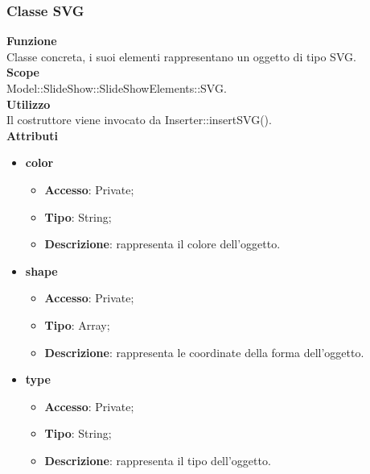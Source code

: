 {	\subsubsection{Classe SVG}{
		\label{SVG}
		\textbf{Funzione}\\
			\indent Classe concreta, i suoi elementi rappresentano un oggetto di tipo SVG.\\
	   	\textbf{Scope}\\
			\indent Model::SlideShow::SlideShowElements::SVG.\\
		\textbf{Utilizzo}\\
			\indent Il costruttore viene invocato da Inserter::insertSVG().\\
		\textbf{Attributi}
		\begin{itemize}
			\item \textbf{color}
			\begin{itemize}
				\item \textbf{Accesso}: Private;
				\item \textbf{Tipo}: String;
				\item \textbf{Descrizione}: rappresenta il colore dell’oggetto.
			\end{itemize}
			\item \textbf{shape}
			\begin{itemize}
				\item \textbf{Accesso}: Private;
				\item \textbf{Tipo}: Array;
				\item \textbf{Descrizione}: rappresenta le coordinate della forma dell’oggetto.
			\end{itemize}
			\item \textbf{type}
			\begin{itemize}
				\item \textbf{Accesso}: Private;
				\item \textbf{Tipo}: String;
				\item \textbf{Descrizione}: rappresenta il tipo dell'oggetto.
			\end{itemize}
		\end{itemize}
		}
}
